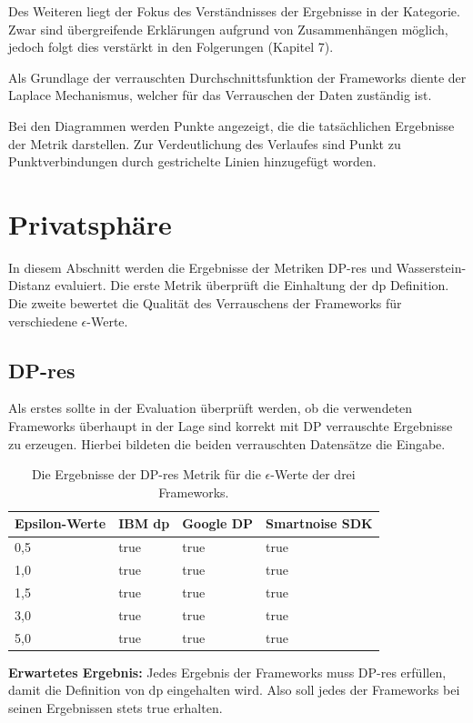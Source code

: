 Des Weiteren liegt der Fokus des Verständnisses der Ergebnisse in der Kategorie. Zwar sind übergreifende Erklärungen aufgrund von Zusammenhängen möglich, jedoch folgt dies verstärkt in den Folgerungen (Kapitel 7).

Als Grundlage der verrauschten Durchschnittsfunktion der Frameworks diente der Laplace Mechanismus, welcher für das Verrauschen der Daten zuständig ist.

Bei den Diagrammen werden Punkte angezeigt, die die tatsächlichen Ergebnisse der Metrik darstellen. Zur Verdeutlichung des Verlaufes sind Punkt zu Punktverbindungen durch gestrichelte Linien hinzugefügt worden.
\newpage

\section{Privatsphäre}
In diesem Abschnitt werden die Ergebnisse der Metriken DP-res und Wasserstein-Distanz evaluiert. Die erste Metrik überprüft die Einhaltung der \gls{dp} Definition. Die zweite bewertet die Qualität des Verrauschens der Frameworks für verschiedene $\epsilon$-Werte.
\subsection{DP-res}
Als erstes sollte in der Evaluation überprüft werden, ob die verwendeten Frameworks überhaupt in der Lage sind korrekt mit DP verrauschte Ergebnisse zu erzeugen. Hierbei bildeten die beiden verrauschten Datensätze die Eingabe.
\begin{table}[h]
	\centering
	\begin{tabular}{ l l l l} \toprule
		\textbf{Epsilon-Werte} & \textbf{IBM \gls{dp}} & \textbf{Google DP} & \textbf{Smartnoise SDK}  \\ \midrule
		0,5	& true  & true & true\\
		1,0 	& true  & true & true\\
		1,5 & true  & true & true\\
		3,0	& true  & true & true\\
		5,0   & true  & true & true\\ \bottomrule
	\end{tabular}
	\caption{Die Ergebnisse der DP-res Metrik für die $\epsilon$-Werte der drei Frameworks.}
	\label{tab :dp_res}
\end{table}

\textbf{Erwartetes Ergebnis:}
Jedes Ergebnis der Frameworks muss DP-res erfüllen, damit die Definition von \gls{dp} eingehalten wird. Also soll jedes der Frameworks bei seinen Ergebnissen stets true erhalten.

